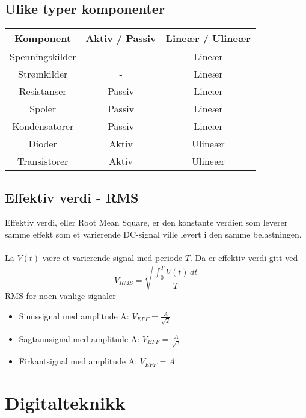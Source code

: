 \documentclass{article}
\begin{document}
\subsection{Ulike typer komponenter}
\begin{table}[h]
    \centering
    \begin{tabular}{c|c|c}
    Komponent       & Aktiv / Passiv    & Lineær / Ulineær \\
    \hline
    Spenningskilder & -         & Lineær\\
    Strømkilder     & -         & Lineær\\
    Resistanser     & Passiv    & Lineær\\
    Spoler          & Passiv    & Lineær\\
    Kondensatorer   & Passiv    & Lineær\\
    Dioder          & Aktiv     & Ulineær\\
    Transistorer    & Aktiv     & Ulineær
    \end{tabular}
\end{table}

\subsection{Effektiv verdi - RMS}
Effektiv verdi, eller Root Mean Square, er den konstante verdien som leverer samme effekt som et varierende DC-signal ville levert i den samme belastningen.\\\\
La $V(t)$ være et varierende signal med periode $T$. Da er effektiv verdi gitt ved
\[V_{RMS} = \sqrt{\frac{\int_0^T V(t)\,dt}{T}}\]
RMS for noen vanlige signaler
\begin{itemize}
    \item Sinussignal med amplitude A: $V_{EFF} = \frac{A}{\sqrt{2}}$
    \item Sagtannsignal med amplitude A: $V_{EFF} = \frac{A}{\sqrt{3}}$
    \item Firkantsignal med amplitude A: $V_{EFF} = A$
\end{itemize}





\section{Digitalteknikk}
\end{document}
